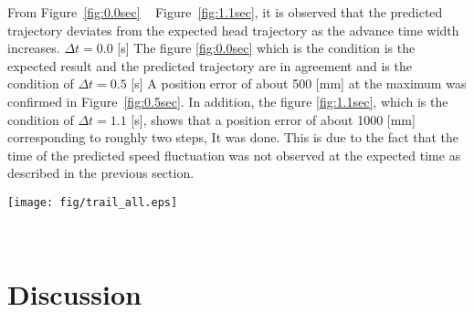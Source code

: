 \documentclass{sigchi}
\begin{document}

From Figure~\ref{fig:0.0sec} ~ Figure~\ref{fig:1.1sec}, it is observed that the predicted trajectory deviates from the expected head trajectory as the advance time width increases. $ \Delta t = 0.0 $ [s] The figure \ref{fig:0.0sec} which is the condition is the expected result and the predicted trajectory are in agreement and is the condition of $ \Delta t = 0.5 $ [s] A position error of about 500 [mm] at the maximum was confirmed in Figure~\ref{fig:0.5sec}. In addition, the figure \ref{fig:1.1sec}, which is the condition of $ \Delta t = 1.1 $ [s], shows that a position error of about 1000 [mm] corresponding to roughly two steps, It was done. This is due to the fact that the time of the predicted speed fluctuation was not observed at the expected time as described in the previous section.


\begin{figure*}
\centering
  \texttt{[image: fig/trail\_all.eps]}
  \caption{$\Delta t$ = 1.1[s]}~\label{fig:1.1sec}
\end{figure*}

\section{Discussion}
\end{document}

